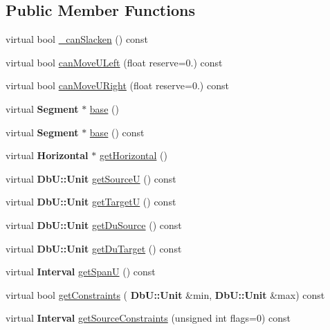 \subsection*{Public Member Functions}
\begin{DoxyCompactItemize}
\item 
virtual bool \hyperlink{classKatabatic_1_1AutoHorizontal_a2ced98fb06f208aa88c0962a706e64db}{\+\_\+can\+Slacken} () const
\item 
virtual bool \hyperlink{classKatabatic_1_1AutoHorizontal_a9b0c21eeb26c256876592ba63438da74}{can\+Move\+U\+Left} (float reserve=0.) const
\item 
virtual bool \hyperlink{classKatabatic_1_1AutoHorizontal_ad0c972e34d6bac47bd9276a7d6e053d8}{can\+Move\+U\+Right} (float reserve=0.) const
\item 
virtual \textbf{ Segment} $\ast$ \hyperlink{classKatabatic_1_1AutoHorizontal_a9e651c17b47f82166a02865c9296a2df}{base} ()
\item 
virtual \textbf{ Segment} $\ast$ \hyperlink{classKatabatic_1_1AutoHorizontal_a6f14a3faa93f2c610ea0d2cc7d903706}{base} () const
\item 
virtual \textbf{ Horizontal} $\ast$ \hyperlink{classKatabatic_1_1AutoHorizontal_a659b8ed90de679564924afe07af478de}{get\+Horizontal} ()
\item 
virtual \textbf{ Db\+U\+::\+Unit} \hyperlink{classKatabatic_1_1AutoHorizontal_ad521ffba761b0e81b7b81b99d62f76f9}{get\+SourceU} () const
\item 
virtual \textbf{ Db\+U\+::\+Unit} \hyperlink{classKatabatic_1_1AutoHorizontal_a4d52a506cd19dfa8e22e1dc0695bd960}{get\+TargetU} () const
\item 
virtual \textbf{ Db\+U\+::\+Unit} \hyperlink{classKatabatic_1_1AutoHorizontal_a760500b1fd027c71f5362dd8c0b01ea7}{get\+Du\+Source} () const
\item 
virtual \textbf{ Db\+U\+::\+Unit} \hyperlink{classKatabatic_1_1AutoHorizontal_a76e349c14c904b3300a15caa1ee8b680}{get\+Du\+Target} () const
\item 
virtual \textbf{ Interval} \hyperlink{classKatabatic_1_1AutoHorizontal_a0b5ac47ab175815e1a9bc07f2517614a}{get\+SpanU} () const
\item 
virtual bool \hyperlink{classKatabatic_1_1AutoHorizontal_a16737e7f2b77f8595fd2b607fac0f2f5}{get\+Constraints} (\textbf{ Db\+U\+::\+Unit} \&min, \textbf{ Db\+U\+::\+Unit} \&max) const
\item 
virtual \textbf{ Interval} \hyperlink{classKatabatic_1_1AutoHorizontal_a3239751f475bc65adb9d56f6c771ebb0}{get\+Source\+Constraints} (unsigned int flags=0) const

\end{DoxyCompactItemize}
